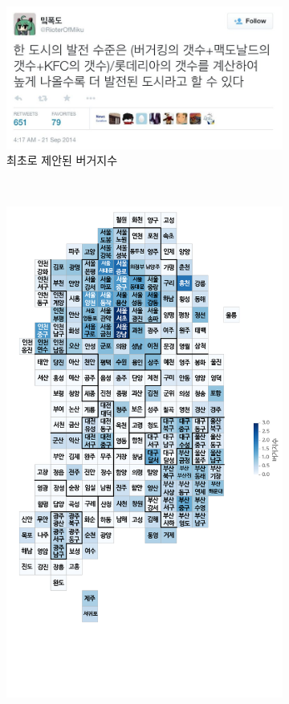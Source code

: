 \documentclass{scrartcl}
\begin{document}
\begin{figure}[!ht]
    \centering
    \begin{subfigure}[b]{0.6\textwidth}
        \includegraphics[width=\textwidth]{../figs/burgerindex.jpeg}
        \caption{최초로 제안된 버거지수}\label{fig:firstbi}
    \end{subfigure}~
    \begin{subfigure}[b]{0.3\textwidth}
        \includegraphics[width=\textwidth]{../figs/burgerindexmap.png}

\end{subfigure}
\end{figure}
\end{document}
